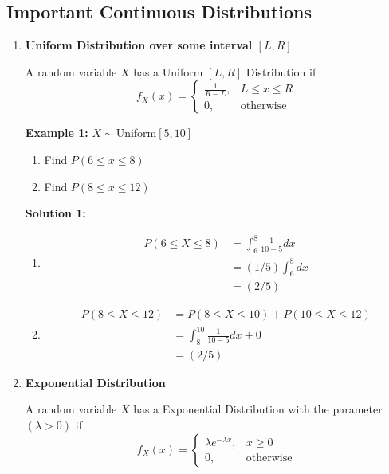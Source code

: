 \documentclass[12pt]{article}
\begin{document}
\subsection{Important Continuous Distributions}

\begin{enumerate}
	\item{
	\textbf{Uniform Distribution over some interval $[L,R]$}
	
	\begin{tcolorbox}[title=Defintion: Uniform Distribution]
		A random variable $X$ has a Uniform $[L,R]$ Distribution if 
		$$f_X (x) = \begin{cases}
		\frac{1}{R-L} , & L \leq x \leq R\\
		0 , & \text{otherwise}
		\end{cases}$$
	\end{tcolorbox}

	\textbf{Example 1:} $X \sim $Uniform$[5,10]$
	\begin{enumerate}
		\item{Find $P(6 \leq x \leq 8)$}
		\item{Find $P(8 \leq x \leq 12)$}
	\end{enumerate}
	
	\textbf{Solution 1:}
	\begin{enumerate}
		\item{
		\begin{align*}
			P(6 \leq X \leq 8) &= \int^{8}_{6} \frac{1}{10-5} dx\\
			&= (1/5) \int^{8}_{6} dx\\
			&= (2/5)
		\end{align*}
		}
		\item{
		\begin{align*}
			P(8 \leq X \leq 12) &= P(8 \leq X \leq 10) + P(10 \leq X \leq 12)\\
			&= \int^{10}_{8} \frac{1}{10-5} dx + 0\\
			&= (2/5)
		\end{align*}
		}
	\end{enumerate}
	}
	
	\item{
	
	\textbf{Exponential Distribution}
	
	\begin{tcolorbox}[title=Defintion: Exponential Distribution]
		A random variable $X$ has a Exponential Distribution with the parameter $(\lambda > 0)$ if 
		$$f_X (x) = \begin{cases}
		\lambda e^{-\lambda x} , & x \geq 0\\
		0 , & \text{otherwise}
		\end{cases}$$
	\end{tcolorbox}
	
}
\end{enumerate}
\end{document}
